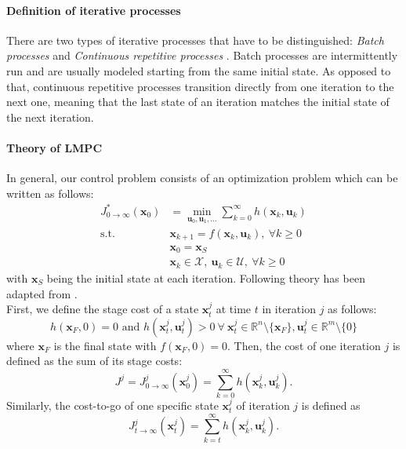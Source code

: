\paragraph{Definition of iterative processes}
There are two types of iterative processes that have to be distinguished: \emph{Batch processes} and \emph{Continuous repetitive processes} \cite{Wang2009}. Batch processes are intermittently run and are usually modeled starting from the same initial state. As opposed to that, continuous repetitive processes transition directly from one iteration to the next one, meaning that the last state of an iteration matches the initial state of the next iteration.
\paragraph{Theory of LMPC}
In general, our control problem consists of an optimization problem which can be written as follows:
\begin{subequations}\label{eq:generalProblem}
\begin{align}
J_{0\rightarrow \infty}^*(\bm{x}_0)&=\min_{\bm{u}_0,\bm{u}_1,\ldots} \sum\limits_{k=0}^{\infty} h(\bm{x}_k,\bm{u}_k)\\
\textrm{s.t. }
&\bm{x}_{k+1}=f(\bm{x}_k,\bm{u}_k),~\forall k\geq 0 \\
&\bm{x}_0 = \bm{x}_S \\
&\bm{x}_k \in \mathcal{X},~\bm{u}_k \in \mathcal{U},~\forall k\geq 0
\end{align}
\end{subequations}
with $\bm{x}_S$ being the initial state at each iteration.
Following theory has been adapted from \cite{Rosolia2016}.\\
First, we define the stage cost of a state $\bm{x}_t^j$ at time $t$ in iteration $j$ as follows:
\begin{equation}\label{eq:iterationCost}
h(\bm{x}_F,0)=0\text{ and } h(\bm{x}_t^j,\bm{u}_t^j)>0\ \forall\ \bm{x}_t^j\in\mathbb{R}^n\setminus \{\bm{x}_F\},\bm{u}_t^j\in\mathbb{R}^m\setminus\{0\}
\end{equation}
where $\bm{x}_F$ is the final state with $f(\bm{x}_F,0)=0$.
Then, the cost of one iteration $j$ is defined as the sum of its stage costs:
\begin{equation}
J^j = J_{0\rightarrow\infty}^j(\bm{x}_0^j)=\sum_{k=0}^\infty h(\bm{x}_k^j,\bm{u}_k^j).
\end{equation}
Similarly, the cost-to-go of one specific state $\bm{x}_t^j$ of iteration $j$ is defined as
\begin{equation}\label{eq:LMPC_costToGo}
J_{t\rightarrow\infty}^j(\bm{x}_t^j)=\sum_{k=t}^\infty h(\bm{x}_k^j,\bm{u}_k^j).
\end{equation}
